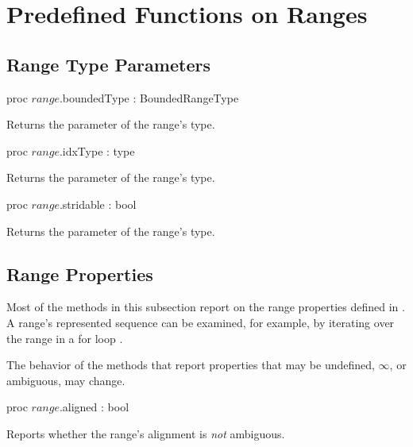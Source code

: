 \section{Predefined Functions on Ranges}
\label{Predefined_Range_Functions}

\subsection{Range Type Parameters}
\label{Range_Type_Accessors}

\begin{protohead}
proc $range$.boundedType : BoundedRangeType
\end{protohead}
\begin{protobody}
Returns the  parameter of the range's type.
\end{protobody}

\begin{protohead}
proc $range$.idxType : type
\end{protohead}
\begin{protobody}
Returns the  parameter of the range's type.
\end{protobody}

\begin{protohead}
proc $range$.stridable : bool
\end{protohead}
\begin{protobody}
Returns the  parameter of the range's type.
\end{protobody}

\subsection{Range Properties}
\label{Range_Properties}

Most of the methods in this subsection report on
the range properties defined in .
A range's represented sequence can be examined, for example,
by iterating over the range in a for loop .

\begin{openissue}
The behavior of the methods that report properties that may be
undefined, $\infty$, or ambiguous, may change.
\end{openissue}

\begin{protohead}
proc $range$.aligned : bool
\end{protohead}
\begin{protobody}
Reports whether the range's alignment is \emph{not} ambiguous.
\end{protobody}


